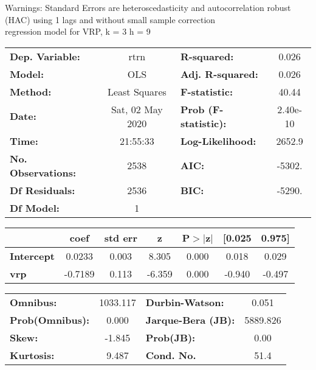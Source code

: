 Warnings: \newline
 [1] Standard Errors are heteroscedasticity and autocorrelation robust (HAC) using 1 lags and without small sample correction\\ 

regression model for VRP, k = 3 h = 9\begin{center}
\begin{tabular}{lclc}
\toprule
\textbf{Dep. Variable:}    &       rtrn       & \textbf{  R-squared:         } &     0.026   \\
\textbf{Model:}            &       OLS        & \textbf{  Adj. R-squared:    } &     0.026   \\
\textbf{Method:}           &  Least Squares   & \textbf{  F-statistic:       } &     40.44   \\
\textbf{Date:}             & Sat, 02 May 2020 & \textbf{  Prob (F-statistic):} &  2.40e-10   \\
\textbf{Time:}             &     21:55:33     & \textbf{  Log-Likelihood:    } &    2652.9   \\
\textbf{No. Observations:} &        2538      & \textbf{  AIC:               } &    -5302.   \\
\textbf{Df Residuals:}     &        2536      & \textbf{  BIC:               } &    -5290.   \\
\textbf{Df Model:}         &           1      & \textbf{                     } &             \\
\bottomrule
\end{tabular}
\begin{tabular}{lcccccc}
                   & \textbf{coef} & \textbf{std err} & \textbf{z} & \textbf{P$> |$z$|$} & \textbf{[0.025} & \textbf{0.975]}  \\
\midrule
\textbf{Intercept} &       0.0233  &        0.003     &     8.305  &         0.000        &        0.018    &        0.029     \\
\textbf{vrp}       &      -0.7189  &        0.113     &    -6.359  &         0.000        &       -0.940    &       -0.497     \\
\bottomrule
\end{tabular}
\begin{tabular}{lclc}
\textbf{Omnibus:}       & 1033.117 & \textbf{  Durbin-Watson:     } &    0.051  \\
\textbf{Prob(Omnibus):} &   0.000  & \textbf{  Jarque-Bera (JB):  } & 5889.826  \\
\textbf{Skew:}          &  -1.845  & \textbf{  Prob(JB):          } &     0.00  \\
\textbf{Kurtosis:}      &   9.487  & \textbf{  Cond. No.          } &     51.4  \\
\bottomrule
\end{tabular}
\end{center}

